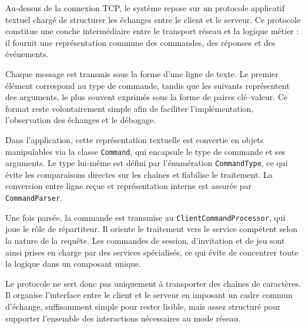 \documentclass[a4paper]{article}
\begin{document}
Au-dessus de la connexion TCP, le système repose sur un protocole applicatif textuel chargé de structurer les échanges entre le client et le serveur. Ce protocole constitue une couche intermédiaire entre le transport réseau et la logique métier : il fournit une représentation commune des commandes, des réponses et des événements.

Chaque message est transmis sous la forme d’une ligne de texte. Le premier élément correspond au type de commande, tandis que les suivants représentent des arguments, le plus souvent exprimés sous la forme de paires clé--valeur. Ce format reste volontairement simple afin de faciliter l’implémentation, l’observation des échanges et le débogage.

Dans l’application, cette représentation textuelle est convertie en objets manipulables via la classe \texttt{Command}, qui encapsule le type de commande et ses arguments. Le type lui-même est défini par l’énumération \texttt{CommandType}, ce qui évite les comparaisons directes sur les chaînes et fiabilise le traitement. La conversion entre ligne reçue et représentation interne est assurée par \texttt{CommandParser}.

Une fois parsée, la commande est transmise au \texttt{ClientCommandProcessor}, qui joue le rôle de répartiteur. Il oriente le traitement vers le service compétent selon la nature de la requête. Les commandes de session, d’invitation et de jeu sont ainsi prises en charge par des services spécialisés, ce qui évite de concentrer toute la logique dans un composant unique.

Le protocole ne sert donc pas uniquement à transporter des chaînes de caractères. Il organise l’interface entre le client et le serveur en imposant un cadre commun d’échange, suffisamment simple pour rester lisible, mais assez structuré pour supporter l’ensemble des interactions nécessaires au mode réseau.
\end{document}
